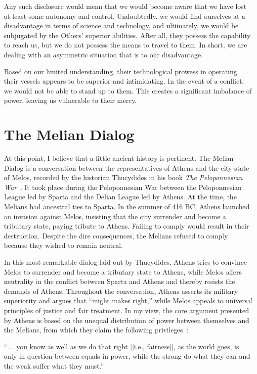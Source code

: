 Any such disclosure would mean that we would become aware that we have lost at least some autonomy and control.
Undoubtedly, we would find ourselves at a disadvantage in terms of science and technology, and ultimately,
we would be subjugated by the Others' superior abilities. After all, they possess the capability to reach us,
but we do not possess the means to travel to them.
In short, we are dealing with an asymmetric situation that is to our disadvantage.

Based on our limited understanding, their technological prowess in operating their vessels appears to be superior and intimidating.
In the event of a conflict, we would not be able to stand up to them.
This creates a significant imbalance of power, leaving us vulnerable to their mercy.



\section{The Melian Dialog}

At this point, I believe that a little ancient history is pertinent. The Melian Dialog is a conversation between the representatives of Athens and the city-state of Melos, recorded by the historian Thucydides in his book \textit{The Peloponnesian War}~\cite{ThucydidesHoPW}. It took place during the Peloponnesian War between the Peloponnesian League led by Sparta and the Delian League led by Athens. At the time, the Melians had ancestral ties to Sparta. In the summer of 416 BC, Athens launched an invasion against Melos, insisting that the city surrender and become a tributary state, paying tribute to Athens. Failing to comply would result in their destruction. Despite the dire consequences, the Melians refused to comply because they wished to remain neutral.

In this most remarkable dialog laid out by Thucydides, Athens tries to convince Melos to surrender and become a tributary state to Athens, while Melos offers neutrality in the conflict between Sparta and Athens and thereby resists the demands of Athens. Throughout the conversation, Athens asserts its military superiority and argues that ``might makes right,'' while Melos appeals to universal principles of justice and fair treatment. In my view, the core argument presented by Athens is based on the unequal distribution of power between themselves and the Melians, from which they claim the following privileges~\cite{ThucydidesHoPW}:
\begin{svgraybox}
``$\ldots$~you know as well as we do that right [[i.e., fairness]], as the world goes, is only in question between equals in power,
 while the strong do what they can and the weak suffer what they must.''
\end{svgraybox}

